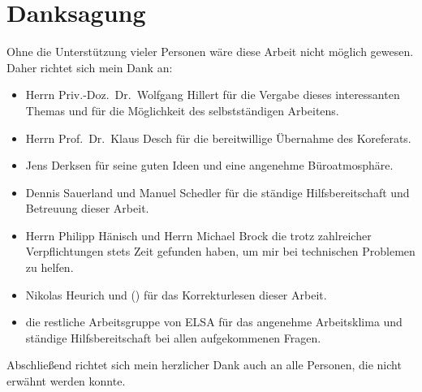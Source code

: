 \chapter*{Danksagung}
\label{sec:danksagung}
Ohne die Unterstützung vieler Personen wäre diese Arbeit nicht möglich gewesen.
Daher richtet sich mein Dank an:
\begin{itemize}
	\item Herrn Priv.-Doz.\ Dr.\ Wolfgang Hillert für die Vergabe dieses interessanten Themas und für die Möglichkeit des selbstständigen Arbeitens.
	
	\item Herrn Prof.\ Dr.\ Klaus Desch für die bereitwillige Übernahme des Koreferats.
	
	\item Jens Derksen für seine guten Ideen und eine angenehme Büroatmosphäre.
	
	\item Dennis Sauerland und Manuel Schedler für die ständige Hilfsbereitschaft und Betreuung dieser Arbeit.
	
	\item Herrn Philipp Hänisch und Herrn Michael Brock die trotz zahlreicher Verpflichtungen stets Zeit gefunden haben, um mir bei technischen Problemen zu helfen.
	
	\item Nikolas Heurich und () für das Korrekturlesen dieser Arbeit.
	
	\item die restliche Arbeitsgruppe von ELSA für das angenehme Arbeitsklima und ständige Hilfsbereitschaft bei allen aufgekommenen Fragen.
\end{itemize}
Abschließend richtet sich mein herzlicher Dank auch an alle Personen, die nicht erwähnt werden konnte.